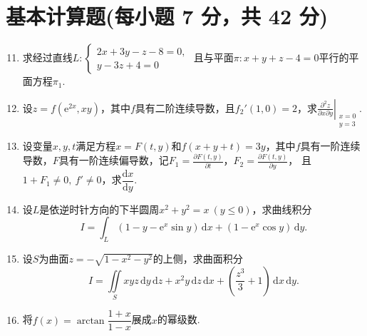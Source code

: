 \documentclass[../main.tex]{subfiles}
\begin{document}
\section{基本计算题(每小题 7 分，共 42 分)}
\begin{enumerate}
    \setcounter{enumi}{10}
    \item 求经过直线$
              L:\begin{cases}
                  2x+3y-z-8=0, \\
                  y-3z+4=0
              \end{cases}$
          且与平面$\pi:x+y+z-4=0$平行的平面方程$\pi_{1}$.
          \vspace{11em}

    \item 设$z=f(\mathrm{e}^{2x},xy)$，其中$f$具有二阶连续导数，且$f_{2}'(1,0)=2$，求$\left.\frac{\partial^{2}z}{\partial x\partial y}\right|_{\substack{x=0\\y=3}}$.
          \vspace{8em}

    \item 设变量$x,y,t$满足方程$x=F(t,y)$和$f(x+y+t)=3y$，其中$f$具有一阶连续导数，$F$具有一阶连续偏导数，记$F_{1}=\frac{\partial F(t,y)}{\partial t}$，$F_{2}=\frac{\partial F(t,y)}{\partial y}$，
          且$1+F_{1}\neq0,\ f'\neq0$，求$\dfrac{\mathrm{d}x}{\mathrm{d}y}$.
          \vspace{8em}

    \item 设$L$是依逆时针方向的下半圆周$x^{2}+y^{2}=x\ (y\leq0)$，求曲线积分
          \[
              I=\int_{L}(1-y-\mathrm{e}^{x}\sin y)\,\mathrm{d}x+(1-\mathrm{e}^{x}\cos y)\,\mathrm{d}y.
          \]
          \vspace{8em}

    \item 设$S$为曲面$z=-\sqrt{1-x^{2}-y^{2}}$的上侧，求曲面积分
          \[
              I=\iint\limits_{S}xyz\,\mathrm{d}y\,\mathrm{d}z+x^{2}y\,\mathrm{d}z\,\mathrm{d}x+\left(\frac{z^{3}}{3}+1\right)\,\mathrm{d}x\,\mathrm{d}y.
          \]
          \vspace{8em}

    \item 将$f(x)=\arctan\dfrac{1+x}{1-x}$展成$x$的幂级数.
          \vspace{9em}
\end{enumerate}
\end{document}
